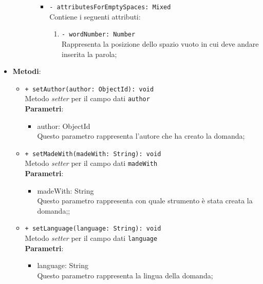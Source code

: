 \begin{itemize}
\begin{itemize}
\begin{itemize}
\begin{itemize}
\begin{enumerate}
						\end{enumerate}    
						\item \texttt{- attributesForEmptySpaces: Mixed}\\
						Contiene i seguenti attributi:
						\begin{enumerate}
							\item \texttt{- wordNumber: Number}\\
							Rappresenta la posizione dello spazio vuoto in cui deve andare inserita la parola;  
						\end{enumerate}        						  						
					\end{itemize}
				\end{itemize}			
			\end{itemize}
			\item \textbf{Metodi}: 
			\begin{itemize}
				\item \texttt{+ setAuthor(author: ObjectId): void} \\
				Metodo \textit{setter} per il campo dati \texttt{author}\\
				\textbf{Parametri}:
				\begin{itemize}
					\item {author: ObjectId}\\
					Questo parametro rappresenta l'autore che ha creato la domanda;
				\end{itemize}
				
				\item \texttt{+ setMadeWith(madeWith: String): void} \\
				Metodo \textit{setter} per il campo dati \texttt{madeWith}\\
				\textbf{Parametri}:
				\begin{itemize}
					\item {madeWith: String}\\
					Questo parametro rappresenta con quale strumento è stata creata la domanda;;
				\end{itemize}
				
				\item \texttt{+ setLanguage(language: String): void} \\
				Metodo \textit{setter} per il campo dati \texttt{language}\\
				\textbf{Parametri}:
				\begin{itemize}
					\item {language: String}\\
					Questo parametro rappresenta la lingua della domanda;
				\end{itemize}
				

\end{itemize}
\end{itemize}
